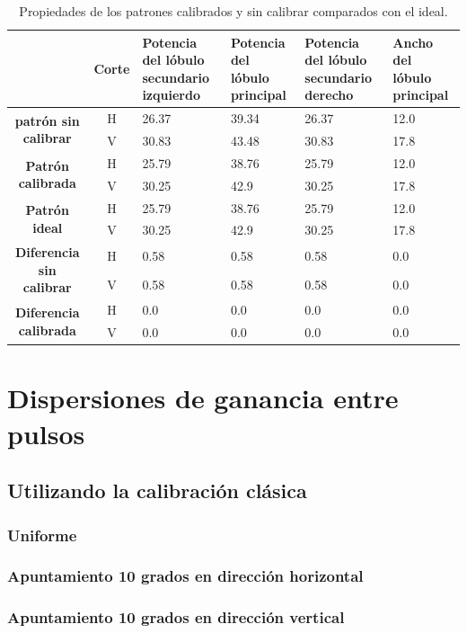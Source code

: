 \begin{table}[H]
  \footnotesize
  \centering
  \begin{tabular}{|c|c|p{2cm}|p{2cm}|p{2cm}|p{2cm}|}
    \cline{2-6}
    \multicolumn{1}{c|}{} & \textbf{Corte} & \textbf{Potencia del lóbulo secundario izquierdo} & \textbf{Potencia del lóbulo principal} &
    \textbf{Potencia del lóbulo secundario derecho} & \textbf{Ancho del lóbulo principal} \tabularnewline\hline
    \multirow{2}{*}{\textbf{patrón sin calibrar}} & H & 26.37 & 39.34 & 26.37 & 12.0 \tabularnewline\cline{2-6}
     & V & 30.83 & 43.48 & 30.83 & 17.8 \tabularnewline\hline
    \multirow{2}{*}{\textbf{Patrón calibrada}} & H & 25.79 & 38.76 & 25.79 & 12.0 \tabularnewline\cline{2-6}
     & V & 30.25 & 42.9 & 30.25 & 17.8 \tabularnewline\hline
    \multirow{2}{*}{\textbf{Patrón ideal}} & H & 25.79 & 38.76 & 25.79 & 12.0 \tabularnewline\cline{2-6}
     & V & 30.25 & 42.9 & 30.25 & 17.8 \tabularnewline\hline
    \multirow{2}{*}{\textbf{Diferencia sin calibrar}} & H & 0.58 & 0.58 & 0.58 & 0.0\tabularnewline\cline{2-6}
     & V & 0.58 & 0.58 & 0.58 & 0.0 \tabularnewline\hline
    \multirow{2}{*}{\textbf{Diferencia calibrada}} & H & 0.0 & 0.0 & 0.0 & 0.0 \tabularnewline\cline{2-6}
     & V & 0.0 & 0.0 & 0.0 & 0.0 \tabularnewline\hline
  \end{tabular}
  \caption{Propiedades de los patrones calibrados y sin calibrar comparados con el ideal.}
  \label{tab:comErrMutual10degRow}
\end{table}


\section{Dispersiones de ganancia entre pulsos}

\subsection{Utilizando la calibración clásica}

\subsubsection{Uniforme}

\subsubsection{Apuntamiento 10 grados en dirección horizontal}

\subsubsection{Apuntamiento 10 grados en dirección vertical}


